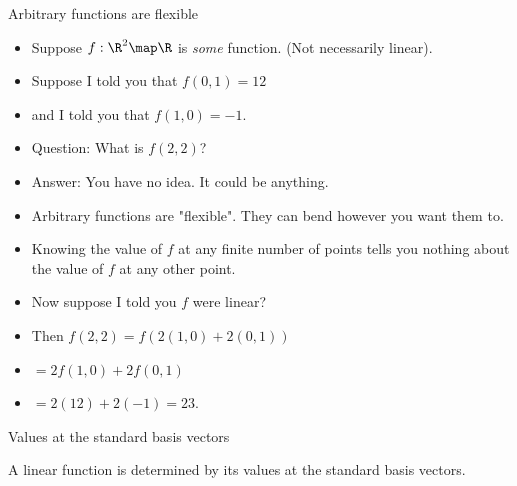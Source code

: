 \documentclass{beamer}
\begin{document}
\beamerdefaultoverlayspecification{<+->}

\begin{frame}{Arbitrary functions are flexible}
\begin{itemize}
\item Suppose $f:\R^2\map\R$ is \emph{some} function. (Not necessarily linear).
\item Suppose I told you that $f(0,1) = 12$
\item and I told you that $f(1, 0) = -1$.
\item Question: What is $f(2, 2)$?
\item Answer: You have no idea. It could be anything.
\item Arbitrary functions are "flexible". They can bend however you want them to.
\item Knowing the value of $f$ at any finite number of points tells you nothing
about the value of $f$ at any other point.
\item Now suppose I told you $f$ were linear?
\item Then $f(2,2) = f\left(2(1,0) + 2(0,1)\right)$
\item $=2f(1,0) + 2f(0,1)$
\item $= 2(12) + 2 (-1) = 23$.
\end{itemize}
\end{frame}

\beamerdefaultoverlayspecification{}

\begin{frame}{Values at the standard basis vectors}

A linear function is determined by its values at the standard basis vectors.


\end{frame}
\end{document}
